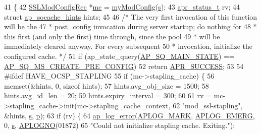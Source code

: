 \begin{DoxyCode}
41 \{
42     \hyperlink{structSSLModConfigRec}{SSLModConfigRec} *\hyperlink{group__APR__Util__MC_ga1cf8c9d89cfb411f224cae715e8c2aaa}{mc} = \hyperlink{group__MOD__SSL__PRIVATE_ga94fd702ebef715ed37309b2be90c68e8}{myModConfig}(\hyperlink{group__APACHE__CORE__LISTEN_ga9359ed159c8b295541e3770172d34550}{s});
43     \hyperlink{group__apr__errno_gaa5105fa83cc322f09382292db8b47593}{apr\_status\_t} rv;
44     \textcolor{keyword}{struct }\hyperlink{structap__socache__hints}{ap\_socache\_hints} hints;
45 
46     \textcolor{comment}{/* The very first invocation of this function will be the}
47 \textcolor{comment}{     * post\_config invocation during server startup; do nothing for}
48 \textcolor{comment}{     * this first (and only the first) time through, since the pool}
49 \textcolor{comment}{     * will be immediately cleared anyway.  For every subsequent}
50 \textcolor{comment}{     * invocation, initialize the configured cache. */}
51     \textcolor{keywordflow}{if} (ap\_state\_query(\hyperlink{group__APACHE__CORE__HTTPD_ga5e12d4f825b573eb4c51c6676ecf0808}{AP\_SQ\_MAIN\_STATE}) == 
      \hyperlink{group__APACHE__CORE__HTTPD_ga19f7cb0f29a648ae407a291d42d1f35b}{AP\_SQ\_MS\_CREATE\_PRE\_CONFIG})
52         \textcolor{keywordflow}{return} \hyperlink{group__apr__errno_ga9ee311b7bf1c691dc521d721339ee2a6}{APR\_SUCCESS};
53 
54 \textcolor{preprocessor}{#ifdef HAVE\_OCSP\_STAPLING}
55     \textcolor{keywordflow}{if} (mc->stapling\_cache) \{
56         memset(&hints, 0, \textcolor{keyword}{sizeof} hints);
57         hints.avg\_obj\_size = 1500;
58         hints.avg\_id\_len = 20;
59         hints.expiry\_interval = 300;
60 
61         rv = mc->stapling\_cache->init(mc->stapling\_cache\_context,
62                                      \textcolor{stringliteral}{"mod\_ssl-stapling"}, &hints, \hyperlink{group__APACHE__CORE__LISTEN_ga9359ed159c8b295541e3770172d34550}{s}, \hyperlink{group__APACHE__CORE__MPM_ga5cd91701e5c167f2b1a38e70ab57817e}{p});
63         \textcolor{keywordflow}{if} (rv) \{
64             \hyperlink{group__APACHE__CORE__LOG_ga5e6676c87418af7a1d323a116c78ecb4}{ap\_log\_error}(\hyperlink{group__APACHE__CORE__LOG_ga655e126996849bcb82e4e5a14c616f4a}{APLOG\_MARK}, \hyperlink{group__APACHE__CORE__LOG_gaa3d7894cd601f48a041689fc21de303d}{APLOG\_EMERG}, 0, 
      \hyperlink{group__APACHE__CORE__LISTEN_ga9359ed159c8b295541e3770172d34550}{s}, \hyperlink{group__APACHE__CORE__LOG_ga1dee8a07e06bc5b3de8b89662c2cd666}{APLOGNO}(01872)
65                          \textcolor{stringliteral}{"Could not initialize stapling cache. Exiting."});

\end{DoxyCode}

